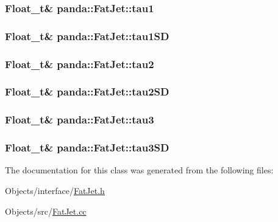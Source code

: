 \label{classpanda_1_1FatJet_af34aeaf274c73856e950a21450dec129}
\hypertarget{classpanda_1_1FatJet_aa6746a89ca7d85ba576e0dd3a50d9254}{
\subsubsection[{tau1}]{\setlength{\rightskip}{0pt plus 5cm}Float\_\-t\& {\bf panda::FatJet::tau1}}}
\label{classpanda_1_1FatJet_aa6746a89ca7d85ba576e0dd3a50d9254}
\hypertarget{classpanda_1_1FatJet_aa7b7e69b9382e5762895173d11c78426}{
\subsubsection[{tau1SD}]{\setlength{\rightskip}{0pt plus 5cm}Float\_\-t\& {\bf panda::FatJet::tau1SD}}}
\label{classpanda_1_1FatJet_aa7b7e69b9382e5762895173d11c78426}
\hypertarget{classpanda_1_1FatJet_ac66ad6c1ad774b8ed4ae3ac2059fee31}{
\subsubsection[{tau2}]{\setlength{\rightskip}{0pt plus 5cm}Float\_\-t\& {\bf panda::FatJet::tau2}}}
\label{classpanda_1_1FatJet_ac66ad6c1ad774b8ed4ae3ac2059fee31}
\hypertarget{classpanda_1_1FatJet_a4e2222a027fb5afc507570ed9844358a}{
\subsubsection[{tau2SD}]{\setlength{\rightskip}{0pt plus 5cm}Float\_\-t\& {\bf panda::FatJet::tau2SD}}}
\label{classpanda_1_1FatJet_a4e2222a027fb5afc507570ed9844358a}
\hypertarget{classpanda_1_1FatJet_a0d1f8250b2e71beda36cd248550ff6cf}{
\subsubsection[{tau3}]{\setlength{\rightskip}{0pt plus 5cm}Float\_\-t\& {\bf panda::FatJet::tau3}}}
\label{classpanda_1_1FatJet_a0d1f8250b2e71beda36cd248550ff6cf}
\hypertarget{classpanda_1_1FatJet_a611cd125d9a3584ca036b9284540ef4a}{
\subsubsection[{tau3SD}]{\setlength{\rightskip}{0pt plus 5cm}Float\_\-t\& {\bf panda::FatJet::tau3SD}}}
\label{classpanda_1_1FatJet_a611cd125d9a3584ca036b9284540ef4a}


The documentation for this class was generated from the following files:\begin{DoxyCompactItemize}
\item 
Objects/interface/\hyperlink{FatJet_8h}{FatJet.h}\item 
Objects/src/\hyperlink{FatJet_8cc}{FatJet.cc}\end{DoxyCompactItemize}
